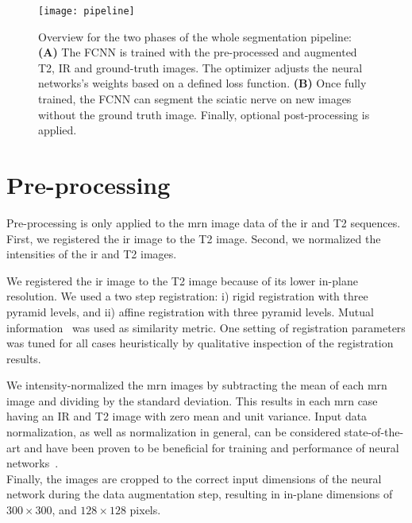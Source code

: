 \begin{figure}[htbp]
	\caption[Segmentation Pipeline]{Overview for the two phases of the whole segmentation pipeline: \textbf{(A)} The FCNN is trained with the pre-processed and augmented T2, IR and ground-truth images. The optimizer adjusts the neural networks's weights based on a defined loss function. \textbf{(B)} Once fully trained, the FCNN can segment the sciatic nerve on new images without the ground truth image. Finally, optional post-processing is applied.}
	\label{fig:pipeline}
	\texttt{[image: pipeline]}    
\end{figure}

\section{Pre-processing} \label{sec:preprocessing}
Pre-processing is only applied to the \gls{mrn} image data of the \gls{ir} and T2 sequences. First, we registered the \gls{ir} image to the T2 image. Second, we normalized the intensities of the \gls{ir} and T2 images.

We registered the \gls{ir} image to the T2 image because of its lower in-plane resolution. We used a two step registration: i) rigid registration with three pyramid levels, and ii) affine registration with three pyramid levels. Mutual information~\cite{Maes1997MultimodalityInformation} was used as similarity metric. One setting of registration parameters was tuned for all cases heuristically by qualitative inspection of the registration results.

We intensity-normalized the \gls{mrn} images by subtracting the mean of each \gls{mrn} image and dividing by the standard deviation. This results in each \gls{mrn} case having an IR and T2 image with zero mean and unit variance. Input data normalization, as well as normalization in general, can be considered state-of-the-art and have been proven to be beneficial for training and performance of neural networks~\cite{Sola1997ImportanceProblems,SergeyIoffe2015BatchNormalization}.\\
Finally, the images are cropped to the correct input dimensions of the neural network during the data augmentation step, resulting in in-plane dimensions of $300 \times 300$, and $128 \times 128$ pixels.

